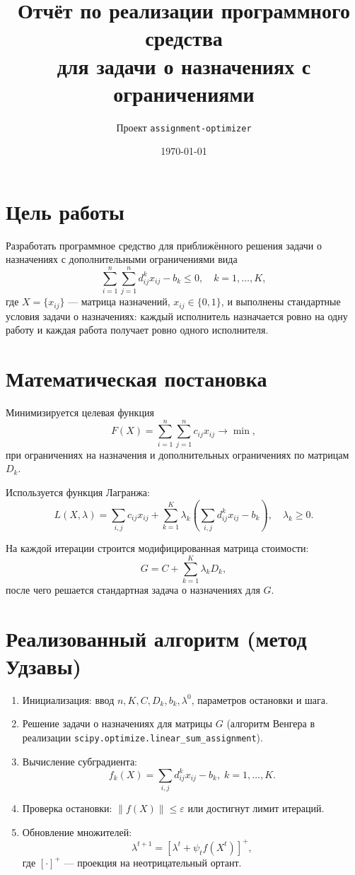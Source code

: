 \documentclass[12pt,a4paper]{article}
\title{Отчёт по реализации программного средства\\для задачи о назначениях с ограничениями}
\author{Проект \texttt{assignment-optimizer}}
\date{\today}
\begin{document}
\maketitle

\section{Цель работы}
Разработать программное средство для приближённого решения задачи о назначениях с дополнительными ограничениями вида
\begin{equation}
\sum_{i=1}^{n}\sum_{j=1}^{n} d_{ij}^{k}x_{ij} - b_k \le 0,\quad k=1,\dots,K,
\end{equation}
где $X=\{x_{ij}\}$ --- матрица назначений, $x_{ij}\in\{0,1\}$, и выполнены стандартные условия задачи о назначениях:
каждый исполнитель назначается ровно на одну работу и каждая работа получает ровно одного исполнителя.

\section{Математическая постановка}
Минимизируется целевая функция
\begin{equation}
F(X)=\sum_{i=1}^{n}\sum_{j=1}^{n} c_{ij}x_{ij}\rightarrow\min,
\end{equation}
при ограничениях на назначения и дополнительных ограничениях по матрицам $D_k$.

Используется функция Лагранжа:
\begin{equation}
L(X,\lambda)=\sum_{i,j} c_{ij}x_{ij}+\sum_{k=1}^{K}\lambda_k\left(\sum_{i,j} d_{ij}^{k}x_{ij}-b_k\right),\quad \lambda_k\ge 0.
\end{equation}

На каждой итерации строится модифицированная матрица стоимости:
\begin{equation}
G = C + \sum_{k=1}^{K}\lambda_k D_k,
\end{equation}
после чего решается стандартная задача о назначениях для $G$.

\section{Реализованный алгоритм (метод Удзавы)}
\begin{enumerate}
  \item Инициализация: ввод $n, K, C, D_k, b_k, \lambda^0$, параметров остановки и шага.
  \item Решение задачи о назначениях для матрицы $G$ (алгоритм Венгера в реализации \texttt{scipy.optimize.linear\_sum\_assignment}).
  \item Вычисление субградиента:
  \[
    f_k(X)=\sum_{i,j} d_{ij}^{k}x_{ij}-b_k,\; k=1,\dots,K.
  \]
  \item Проверка остановки: $\|f(X)\|\le\varepsilon$ или достигнут лимит итераций.
  \item Обновление множителей:
  \[
  \lambda^{t+1}=\left[\lambda^{t}+\psi_t f(X^t)\right]^+,
  \]
  где $[\cdot]^+$ --- проекция на неотрицательный ортант.
\end{enumerate}
\end{document}
